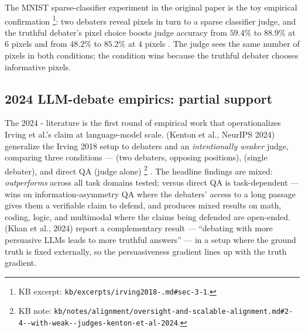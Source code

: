 The MNIST sparse-classifier experiment in the original paper is the
toy empirical confirmation%
\footnote{KB excerpt: \texttt{kb/excerpts/irving2018-.md\#sec-3-1}.}:
two debaters reveal pixels in turn to a sparse classifier judge,
and the truthful debater's pixel choice boosts judge accuracy from
$59.4\%$ to $88.9\%$ at $6$ pixels and from $48.2\%$ to $85.2\%$ at
$4$ pixels \citep[\S{}abstract,\S 3.1]{irving2018-debate}. The judge
sees the same number of pixels in both conditions; the 
condition wins because the truthful debater chooses informative
pixels.

\subsection{2024 LLM-debate empirics: partial support}
\label{sec:oversight-llm-debate}

The 2024 - literature is the first round of empirical work
that operationalizes Irving et al.'s claim at language-model scale.
\citet{kenton2024-debate-llm-judges} (Kenton et al., NeurIPS 2024)
generalize the Irving 2018 setup to  debaters and an
\emph{intentionally weaker}  judge, comparing three conditions ---
 (two debaters, opposing positions),  (single
debater), and direct QA (judge alone)%
\footnote{KB note: \texttt{kb/notes/alignment/oversight-and-scalable-alignment.md\#2-4--with-weak--judges-kenton-et-al-2024}.}
. The headline findings are mixed: 
\emph{outperforms}  across all task domains tested; 
versus direct QA is task-dependent ---  wins on
information-asymmetry QA where the debaters' access to a long passage
gives them a verifiable claim to defend, and produces mixed results on
math, coding, logic, and multimodal where the claims being defended
are open-ended. \citet{khan2024-debating-llms} (Khan et al., 2024)
report a complementary result --- ``debating with more persuasive LLMs
leads to more truthful answers''  --- in a setup where the ground truth
is fixed externally, so the persuasiveness gradient lines up with the
truth gradient.

